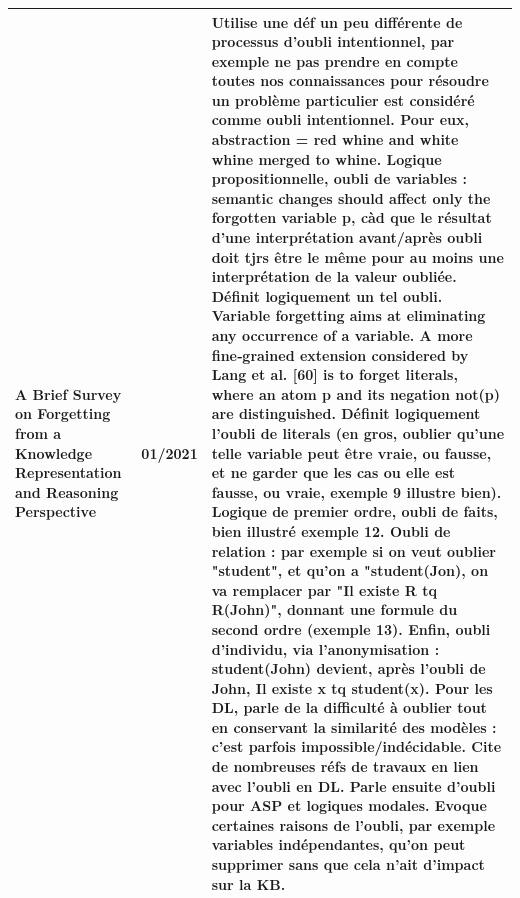 \documentclass[french]{article}
\begin{document}
\begin{table}[ht!]
\begin{center}
\begin{tabular}{|p{}|p{}|p{}|}
            A Brief Survey on Forgetting from a Knowledge Representation and Reasoning Perspective \cite{timm_intentional_2018}
            & 01/2021
            & Utilise une déf un peu différente de processus d'oubli intentionnel, par exemple ne pas prendre en compte toutes nos connaissances pour résoudre un problème particulier est considéré comme oubli intentionnel. Pour eux, abstraction = red whine and white whine merged to whine.
            Logique propositionnelle, oubli de variables : semantic changes should affect only the forgotten variable p, càd que le résultat d'une interprétation avant/après oubli doit tjrs être le même pour au moins une interprétation de la valeur oubliée. Définit logiquement un tel oubli. Variable forgetting aims at eliminating any occurrence of a variable. A more fine‑grained extension considered by Lang et al. [60] is to forget literals, where an atom p and its negation not(p) are distinguished. Définit logiquement l'oubli de literals (en gros, oublier qu'une telle variable peut être vraie, ou fausse, et ne garder que les cas ou elle est fausse, ou vraie, exemple 9 illustre bien).
            Logique de premier ordre, oubli de faits, bien illustré exemple 12.
            Oubli de relation : par exemple si on veut oublier "student", et qu'on a "student(Jon), on va remplacer par "Il existe R tq R(John)", donnant une formule du second ordre (exemple 13).
            Enfin, oubli d'individu, via l'anonymisation : student(John) devient, après l'oubli de John, Il existe x tq student(x).
            Pour les DL, parle de la difficulté à oublier tout en conservant la similarité des modèles : c'est parfois impossible/indécidable. Cite de nombreuses réfs de travaux en lien avec l'oubli en DL. Parle ensuite d'oubli pour ASP et logiques modales.
            Evoque certaines raisons de l'oubli, par exemple variables indépendantes, qu'on peut supprimer sans que cela n'ait d'impact sur la KB.
            \\
            \hline
        \end{tabular}
    \end{center}
    \end{table}
    \newpage
\end{document}
